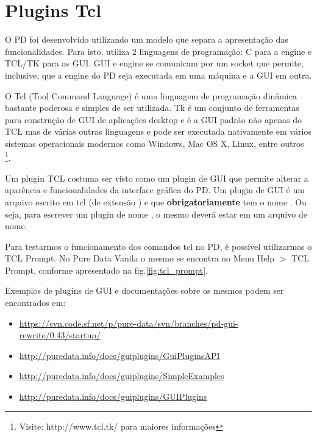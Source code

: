 \chapter{Plugins Tcl}


O PD foi desenvolvido utilizando um modelo que separa a apresentação das
funcionalidades.
Para isto, utiliza 2 linguagens de programação: C para a engine e TCL/TK para as
GUI.
GUI e engine se comunicam por um socket que permite, inclusive, que a engine
do PD seja executada em uma máquina e a GUI em outra.

O Tcl (Tool Command Language) é uma linguagem de programação dinâmica bastante
poderosa e simples de ser utilizada. 
Tk é um conjunto de ferramentas para construção de GUI de aplicações desktop e é
a GUI padrão não apenas do TCL mas de várias outras linguagens e pode ser
executada nativamente em vários sistemas operacionais modernos como Windows, Mac
OS X, Linux, entre outros \footnote{Visite: http://www.tcl.tk/ para maiores
informações}.


Um plugin TCL costuma ser visto como um plugin de GUI que permite alterar a
aparência e funcionalidades da interface gráfica do PD.
Um plugin de GUI é um arquivo escrito em tcl (de extensão ) e que
\textbf{obrigatoriamente} tem o nome .
Ou seja, para escrever um plugin de nome , o mesmo deverá estar em
um arquivo de nome.

Para testarmos o funcionamento dos comandos tcl no PD, é possível utilizarmos o
TCL Prompt.
No Pure Data Vanila o mesmo se encontra no Menu Help $>$ TCL Prompt, conforme
apresentado na fig.\ref{fig:tcl_prompt}.


Exemplos de plugins de GUI e documentações sobre os mesmos podem ser encontrados em:
\begin{itemize}
   \item \url{https://svn.code.sf.net/p/pure-data/svn/branches/pd-gui-rewrite/0.43/startup/}
   \item \url{http://puredata.info/docs/guiplugins/GuiPluginsAPI}
   \item \url{http://puredata.info/docs/guiplugins/SimpleExamples}
   \item \url{http://puredata.info/docs/guiplugins/GUIPlugins}
\end{itemize}

